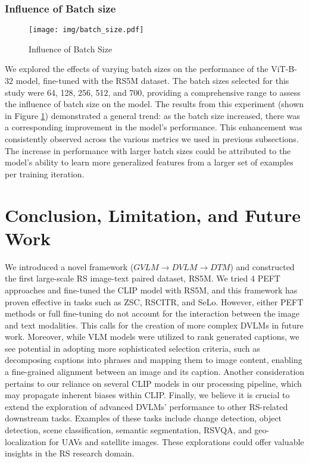 \documentclass[journal]{IEEEtran}
\begin{document}
\subsubsection{Influence of Batch size}



\begin{figure}
    \centering
    \texttt{[image: img/batch\_size.pdf]}
    \caption{Influence of Batch Size}
    \label{fig:batch_size}
\end{figure}

We explored the effects of varying batch sizes on the performance of the ViT-B-32 model, fine-tuned with the RS5M dataset. The batch sizes selected for this study were 64, 128, 256, 512, and 700, providing a comprehensive range to assess the influence of batch size on the model.
The results from this experiment (shown in Figure \ref{fig:batch_size}) demonstrated a general trend: as the batch size increased, there was a corresponding improvement in the model's performance. This enhancement was consistently observed across the various metrics we used in previous subsections. The increase in performance with larger batch sizes could be attributed to the model's ability to learn more generalized features from a larger set of examples per training iteration. 










\section{Conclusion, Limitation, and Future Work}
We introduced a novel framework ($GVLM \xrightarrow{} DVLM \xrightarrow{} DTM$) and constructed the first large-scale RS image-text paired dataset, RS5M. We tried 4 PEFT approaches and fine-tuned the CLIP model with RS5M, and this framework has proven effective in tasks such as ZSC, RSCITR, and SeLo. However, either PEFT methods or full fine-tuning do not account for the interaction between the image and text modalities. This calls for the creation of more complex DVLMs in future work. Moreover, while VLM models were utilized to rank generated captions, we see potential in adopting more sophisticated selection criteria, such as decomposing captions into phrases and mapping them to image content, enabling a fine-grained alignment between an image and its caption. Another consideration pertains to our reliance on several CLIP models in our processing pipeline, which may propagate inherent biases within CLIP. Finally, we believe it is crucial to extend the exploration of advanced DVLMs' performance to other RS-related downstream tasks. Examples of these tasks include change detection, object detection, scene classification, semantic segmentation, RSVQA, and geo-localization for UAVs and satellite images. These explorations could offer valuable insights in the RS research domain.
\end{document}
